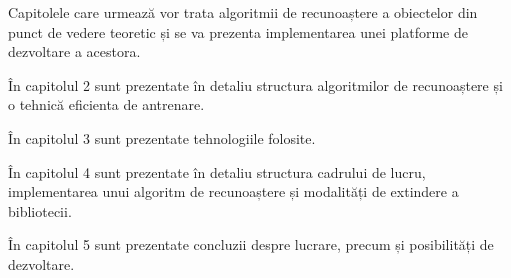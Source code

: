 Capitolele care urmează vor trata algoritmii de recunoaștere a obiectelor din punct de vedere teoretic și se va prezenta implementarea unei platforme de dezvoltare a acestora.

În capitolul 2 sunt prezentate în detaliu structura algoritmilor de recunoaștere și o tehnică eficienta de antrenare.

În capitolul 3 sunt prezentate tehnologiile folosite.

În capitolul 4 sunt prezentate în detaliu structura cadrului de lucru, implementarea unui algoritm de recunoaștere și modalități de extindere a bibliotecii.

În capitolul 5 sunt prezentate concluzii despre lucrare, precum și posibilități de dezvoltare.

\pagebreak